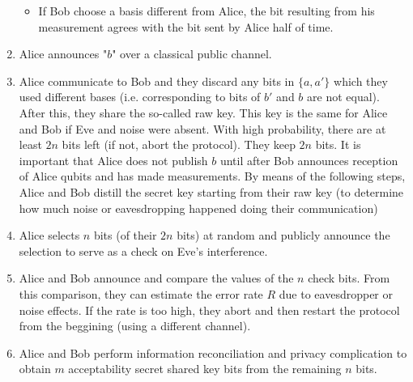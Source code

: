 \documentclass[]{book}
\theoremstyle{nonumberplain}
\begin{document}
\begin{enumerate}
\begin{itemize}
        \item If Bob choose a basis different from Alice, the bit resulting from his measurement agrees with the bit sent by Alice half of time.
    \end{itemize}
    \item Alice announces "$b$" over a classical public channel.
    \item Alice communicate to Bob and they discard any bits in $\{a,a'\}$ which they used different bases (i.e. corresponding to bits of $b'$ and $b$ are not equal). After this, they share the so-called raw key. This key is the same for Alice and Bob if Eve and noise were absent. With high probability, there are at least $2n$ bits left (if not, abort the protocol). They keep $2n$ bits. It is important that Alice does not publish $b$ until after Bob announces reception of Alice qubits and has made measurements. By means of the following steps, Alice and Bob distill the secret key starting from their raw key (to determine how much noise or eavesdropping happened doing their communication)
    \item Alice selects $n$ bits (of their $2n$ bits) at random and publicly announce the selection to serve as a check on Eve's interference. 
    \item Alice and Bob announce and compare the values of the $n$ check bits. From this comparison, they can estimate the error rate $R$ due to eavesdropper or noise effects. If the rate is too high, they abort and then restart the protocol from the beggining (using a different channel).
    \item Alice and Bob perform information reconciliation and privacy complication to obtain $m$ acceptability secret shared key bits from the remaining $n$ bits. 
\end{enumerate} 
\end{document}
